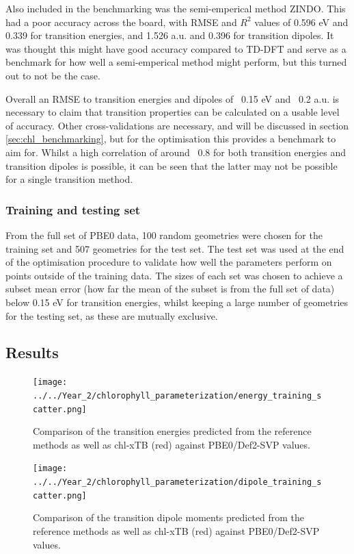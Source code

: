 Also included in the benchmarking was the semi-emperical method ZINDO. This had a
poor accuracy across the board, with RMSE and $R^2$ values of 0.596 eV and 0.339
for transition energies, and 1.526 a.u. and 0.396 for transition dipoles. It was
thought this might have good accuracy compared to TD-DFT and serve as a benchmark
for how well a semi-emperical method might perform, but this turned out to not be
the case.

Overall an RMSE to transition energies and dipoles of ~0.15 eV and ~0.2 a.u. is 
necessary to claim that transition properties can be calculated on a usable level 
of accuracy. Other cross-validations are necessary, and will be discussed in section
\ref{sec:chl_benchmarking}, but for the optimisation this provides a benchmark to 
aim for. Whilst a high correlation of around ~0.8 for both transition energies and
transition dipoles is possible, it can be seen that the latter may not be possible
for a single transition method.

\subsubsection{Training and testing set}
\label{subsubsec:train_test}
From the full set of PBE0 data, 100 random geometries were chosen for the training 
set and 507 geometries for the test set. The test set was used at the end of the 
optimisation procedure to validate how well the parameters perform on points outside 
of the training data. The sizes of each set was chosen to achieve a subset mean
error (how far the mean of the subset is from the full set of data) below 0.15 eV
for transition energies, whilst keeping a large number of geometries for the testing
set, as these are mutually exclusive.

\afterpartskip
\subsection{Results}
\label{subsec:chl_opt_results}

\begin{figure}
    \centering
    \texttt{[image: ../../Year\_2/chlorophyll\_parameterization/energy\_training\_scatter.png]}
    \label{fig:energy_training_scatter}
    \caption{Comparison of the \Qy transition energies predicted from the reference
    methods as well as chl-xTB (red) against PBE0/Def2-SVP values.}
\end{figure}

\begin{figure}
    \centering
    \texttt{[image: ../../Year\_2/chlorophyll\_parameterization/dipole\_training\_scatter.png]}
    \label{fig:dipole_training_scatter}
    \caption{Comparison of the \Qy transition dipole moments predicted from the
    reference methods as well as chl-xTB (red) against PBE0/Def2-SVP values.}
\end{figure}

